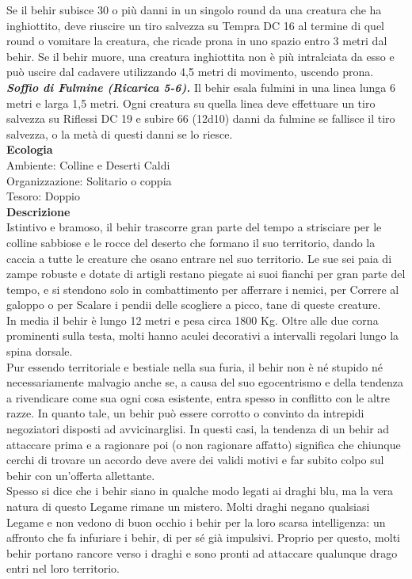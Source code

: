 \begin{multicols}{2}
Se il behir subisce 30 o più danni in un singolo round da una creatura che ha inghiottito, deve riuscire un tiro salvezza su Tempra DC  16 al termine di quel round o vomitare la creatura, che ricade prona in uno spazio entro 3 metri dal behir. Se il behir muore, una creatura inghiottita non è più intralciata da esso e può uscire dal cadavere utilizzando 4,5 metri di movimento, uscendo prona.\\
\emph{\textbf{Soffio di Fulmine (Ricarica 5-6).}} Il behir esala fulmini in una linea lunga 6 metri e larga 1,5 metri. Ogni creatura su quella linea deve effettuare un tiro salvezza su Riflessi DC  19 e subire 66 (12d10) danni da fulmine se fallisce il tiro salvezza, o la metà di questi danni se lo riesce.\\
\textbf{Ecologia}\\
Ambiente: Colline e Deserti Caldi\\
Organizzazione: Solitario o coppia\\
Tesoro: Doppio\\
\textbf{Descrizione}\\
Istintivo e bramoso, il behir trascorre gran parte del tempo a strisciare per le colline sabbiose e le rocce del deserto che formano il suo territorio, dando la caccia a tutte le creature che osano entrare nel suo territorio. Le sue sei paia di zampe robuste e dotate di artigli restano piegate ai suoi fianchi per gran parte del tempo, e si stendono solo in combattimento per afferrare i nemici, per Correre al galoppo o per Scalare i pendii delle scogliere a picco, tane di queste creature.\\
In media il behir è lungo 12 metri e pesa circa 1800 Kg. Oltre alle due corna prominenti sulla testa, molti hanno aculei decorativi a intervalli regolari lungo la spina dorsale.\\
Pur essendo territoriale e bestiale nella sua furia, il behir non è né stupido né necessariamente malvagio anche se, a causa del suo egocentrismo e della tendenza a rivendicare come sua ogni cosa esistente, entra spesso in conflitto con le altre razze. In quanto tale, un behir può essere corrotto o convinto da intrepidi negoziatori disposti ad avvicinarglisi. In questi casi, la tendenza di un behir ad attaccare prima e a ragionare poi (o non ragionare affatto) significa che chiunque cerchi di trovare un accordo deve avere dei validi motivi e far subito colpo sul behir con un'offerta allettante.\\
Spesso si dice che i behir siano in qualche modo legati ai draghi blu, ma la vera natura di questo Legame rimane un mistero. Molti draghi negano qualsiasi Legame e non vedono di buon occhio i behir per la loro scarsa intelligenza: un affronto che fa infuriare i behir, di per sé già impulsivi. Proprio per questo, molti behir portano rancore verso i draghi e sono pronti ad attaccare qualunque drago entri nel loro territorio.\\


\end{multicols}
